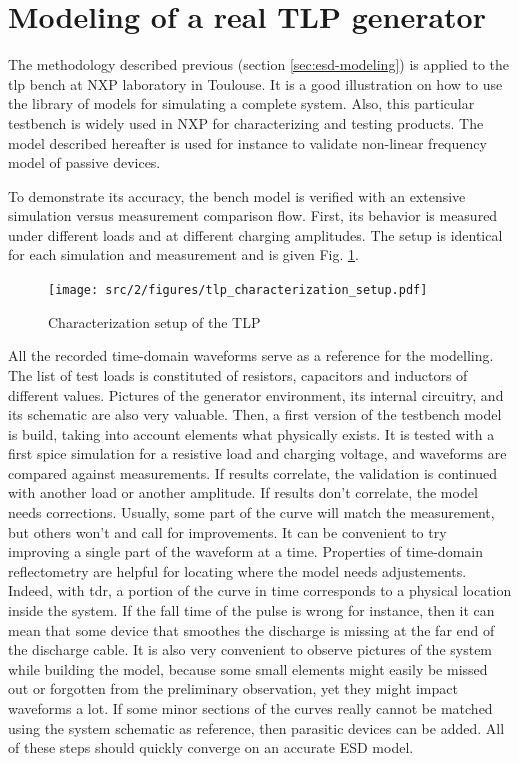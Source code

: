 \section{Modeling of a real TLP generator}
\label{sec:tlp-modeling}

The methodology described previous (section \ref{sec:esd-modeling}) is applied to the \gls{tlp} bench at NXP laboratory in Toulouse.
It is a good illustration on how to use the library of models for simulating a complete system.
Also, this particular testbench is widely used in NXP for characterizing and testing products.
The model described hereafter is used for instance to validate non-linear frequency model of passive devices.

To demonstrate its accuracy, the bench model is verified with an extensive simulation versus measurement comparison flow.
First, its behavior is measured under different loads and at different charging amplitudes.
The setup is identical for each simulation and measurement and is given Fig. \ref{fig:setup-cz-tlp-model}.

\begin{figure}[!h]
  \centering
  \texttt{[image: src/2/figures/tlp\_characterization\_setup.pdf]}
  \caption{Characterization setup of the TLP}
  \label{fig:setup-cz-tlp-model}
\end{figure}

All the recorded time-domain waveforms serve as a reference for the modelling.
The list of test loads is constituted of resistors, capacitors and inductors of different values.
Pictures of the generator environment, its internal circuitry, and its schematic are also very valuable.
Then, a first version of the testbench model is build, taking into account elements what physically exists.
It is tested with a first \gls{spice} simulation for a resistive load and charging voltage, and waveforms are compared against measurements.
If results correlate, the validation is continued with another load or another amplitude.
If results don't correlate, the model needs corrections.
Usually, some part of the curve will match the measurement, but others won't and call for improvements.
It can be convenient to try improving a single part of the waveform at a time.
Properties of time-domain reflectometry are helpful for locating where the model needs adjustements.
Indeed, with \gls{tdr}, a portion of the curve in time corresponds to a physical location inside the system.
If the fall time of the pulse is wrong for instance, then it can mean that some device that smoothes the discharge is missing at the far end of the discharge cable.
It is also very convenient to observe pictures of the system while building the model, because some small elements might easily be missed out or forgotten from the preliminary observation, yet they might impact waveforms a lot.
If some minor sections of the curves really cannot be matched using the system schematic as reference, then parasitic devices can be added.
All of these steps should quickly converge on an accurate ESD model.

